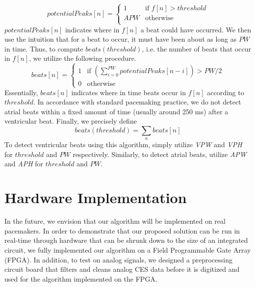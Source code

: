 \documentclass[conference]{IEEEtran}
\newcommand{\APW}{\textit{APW}}
\newcommand{\VPW}{\textit{VPW}}
\newcommand{\APH}{\textit{APH}}
\newcommand{\VPH}{\textit{VPH}}
\begin{document}
\begin{equation*}
	potentialPeaks[n]=\left\{ 
		\begin{array}{lr}
			1 & \text{if } f[n] > threshold \\
			APW & \text{otherwise}\\
		\end{array}
		\right.
\end{equation*}
$potentialPeaks[n]$ indicates where in $f[n]$ a beat could
have occurred. We then use the intuition that for a beat
to occur, it must have been about as long as $PW$ in time.
Thus, to compute $beats(threshold)$, i.e. the number of
beats that occur in $f[n]$, we utilize the following
procedure.
\begin{equation*}
	beats[n]=\left\{ 
		\begin{array}{lc}
			1 & \text{if } \left(\sum_{i=0}^{PW} potentialPeaks[n-i] \right) > PW/2 \\
			0 & \text{otherwise}
		\end{array}
		\right.
\end{equation*}
Essentially, $beats[n]$ indicates where in time beats
occur in $f[n]$ according to $threshold$. In accordance
with standard pacemaking practice, we do not detect atrial beats within a fixed amount of time (usually around 250 ms) after
a ventricular beat. Finally, we
precisely define \begin{equation*}
	beats(threshold) = \sum_n beats[n]
\end{equation*}
To detect ventricular beats using this algorithm,
simply utilize \VPW{} and \VPH{} for $threshold$ and $PW$
respectively. Similarly, to detect atrial beats, utilize
\APW{} and \APH{} for $threshold$ and $PW$.

\section{Hardware Implementation}
In the future, we envision that our algorithm will be
implemented on real pacemakers. In order to
demonstrate that our proposed solution can be run in
real-time through hardware that can be shrunk down to
the size of an integrated circuit, we fully implemented
our algorithm on a Field Programmable Gate Array
(FPGA). In addition, to test on analog signals, we
designed a preprocessing circuit board that filters and
cleans analog CES data before it is digitized and used
for the algorithm implemented on the FPGA.
\end{document}
